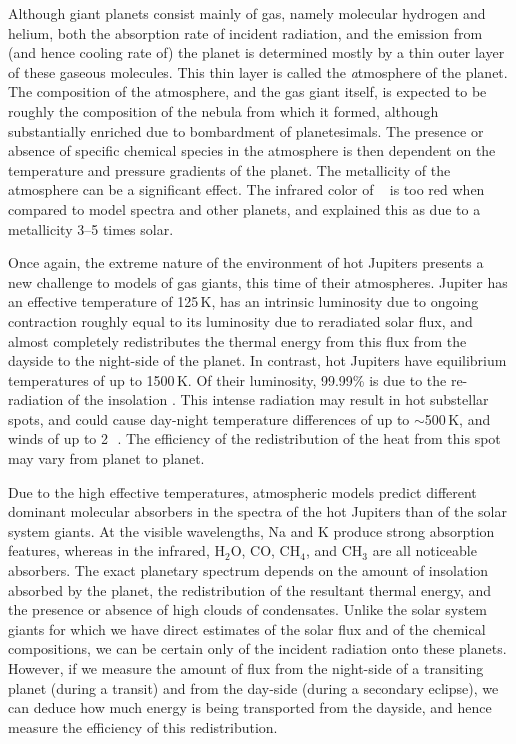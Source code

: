Although giant planets consist mainly of gas, namely molecular hydrogen and helium, both the absorption rate of incident radiation, and the emission from (and hence cooling rate of) the planet is determined mostly by a thin outer layer of these gaseous molecules.
This thin layer is called the {\textit atmosphere} of the planet.
The composition of the atmosphere, and the gas giant itself, is expected to be roughly the composition of the nebula from which it formed, although substantially enriched due to bombardment of planetesimals.
The presence or absence of specific chemical species in the atmosphere is then dependent on the temperature and pressure gradients of the planet.
The metallicity of the atmosphere can be a significant effect.
The infrared color of \tresOne~\citep{Charbonneau_Allen_Megeath:apj:2005a} is too red when compared to model spectra and other planets, and \citet{Fortney_Marley_Lodders:apjl:2005a} explained this as due to a metallicity 3--5 times solar.

Once again, the extreme nature of the environment of hot Jupiters presents a new challenge to models of gas giants, this time of their atmospheres.
Jupiter has an effective temperature of 125\,K, has an intrinsic luminosity due to ongoing contraction roughly equal to its luminosity due to reradiated solar flux, and almost completely redistributes the thermal energy from this flux from the dayside to the night-side of the planet.
In contrast, hot Jupiters have equilibrium temperatures of up to 1500\,K.
Of their luminosity, 99.99\% is due to the re-radiation of the insolation \citep{Marley_Fortney_Seager:PPV:2007a}.
This intense radiation may result in hot substellar spots, and could cause day-night temperature differences of up to $\sim$500\,K, and winds of up to 2\,\kms~\citep{Showman_Guillot:aa:2002a}.
The efficiency of the redistribution of the heat from this spot may vary from planet to planet.

Due to the high effective temperatures, atmospheric models predict different dominant molecular absorbers in the spectra of the hot Jupiters than of the solar system giants.
At the visible wavelengths, Na and K produce strong absorption features, whereas in the infrared, H$_2$O, CO, CH$_4$, and CH$_3$ are all noticeable absorbers.
The exact planetary spectrum depends on the amount of insolation absorbed by the planet, the redistribution of the resultant thermal energy, and the presence or absence of high clouds of condensates.
Unlike the solar system giants for which we have direct estimates of the solar flux and of the chemical compositions, we can be certain only of the incident radiation onto these planets.
However, if we measure the amount of flux from the night-side of a transiting planet (during a transit) and from the day-side (during a secondary eclipse), we can deduce how much energy is being transported from the dayside, and hence measure the efficiency of this redistribution.


